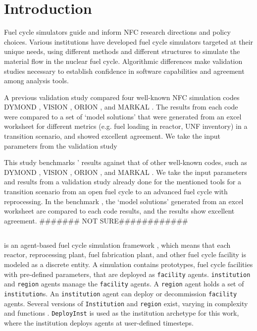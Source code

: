 
\section{Introduction}
Fuel cycle simulators guide and inform \gls{NFC} research directions and policy choices.
Various institutions have developed fuel cycle simulators targeted at their unique needs,
using different methods and different structures
to simulate the material flow in the nuclear fuel cycle.
Algorithmic differences make
validation studies necessary to establish
confidence in software capabilities and
agreement among analysis tools.

A previous validation study \cite{feng_standardized_2016} compared
four well-known \gls{NFC} simulation codes
DYMOND \cite{yacout_modeling_2005},
VISION \cite{jacobson_verifiable_2010},
ORION \cite{gregg_analysis_2012}, and
MARKAL \cite{shay_epa_2006}. The results from each code
were compared to a set of `model solutions' that were generated
from an excel worksheet for different metrics (e.g. fuel loading in reactor,
\gls{UNF} inventory) in a transition scenario, and showed excellent agreement.
We take the input parameters from the validation study \cite{feng_stnadardized_2016}


This study benchmarks \Cyclus' results
against that of other well-known codes, such as
DYMOND \cite{yacout_modeling_2005},
VISION \cite{jacobson_verifiable_2010},
ORION \cite{gregg_analysis_2012}, and
MARKAL \cite{shay_epa_2006}. We take the input
parameters and results from a validation study
\cite{feng_standardized_2016} already done for the
mentioned tools for a transition scenario from an
open fuel cycle to an advanced fuel cycle with
reprocessing. In the benchmark \cite{feng_standardized_2016}, the `model solutions'
generated from an excel worksheet are compared
to each code results, and the results show
excellent agreement.
####### NOT SURE############


\subsection{\Cyclus}

\Cyclus is an agent-based fuel cycle simulation framework 
\cite{huff_fundamental_2016}, which means 
that each reactor, reprocessing plant, fuel fabrication plant, and other fuel cycle
facility is modeled as a discrete entity.
A \Cyclus simulation contains prototypes, fuel cycle facilities with
pre-defined parameters, that are deployed as \texttt{facility} agents.
\texttt{institution} and \texttt{region} agents manage the \texttt{facility} agents.
A \texttt{region} agent holds a set of \texttt{institution}s.
An \texttt{institution} agent can deploy or decommission \texttt{facility} agents.
Several versions of \texttt{Institution}
and \texttt{region} exist, varying in complexity and functions \cite{huff_extensions_2014}.
 \texttt{DeployInst} is used as the institution archetype for this work, where the institution
deploys agents at user-defined timesteps.
